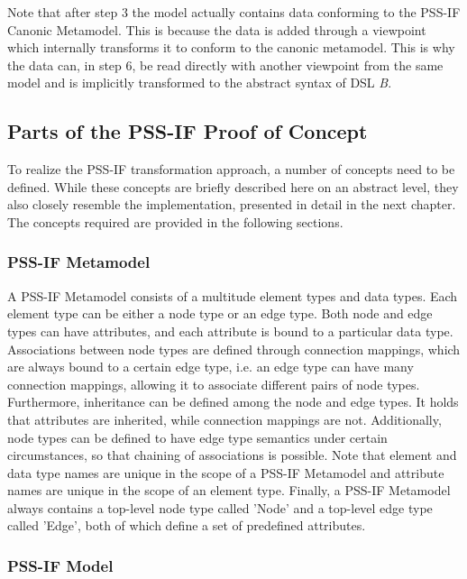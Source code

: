 Note that after step 3 the model actually contains data conforming to the PSS-IF Canonic Metamodel. This is because the data is added through a viewpoint which internally transforms it to conform to the canonic metamodel. This is why the data can, in step 6, be read directly with another viewpoint from the same model and is implicitly transformed to the abstract syntax of DSL \textit{B}.

\subsection{Parts of the PSS-IF Proof of Concept}

To realize the PSS-IF transformation approach, a number of concepts need to be defined. While these concepts are briefly described here on an abstract level, they also closely resemble the implementation, presented in detail in the next chapter. The concepts required are provided in the following sections.

\subsubsection{PSS-IF Metamodel}

A PSS-IF Metamodel consists of a multitude element types and data types. Each element type can be either a node type or an edge type. Both node and edge types can have attributes, and each attribute is bound to a particular data type. Associations between node types are defined through connection mappings, which are always bound to a certain edge type, i.e. an edge type can have many connection mappings, allowing it to associate different pairs of node types. Furthermore, inheritance can be defined among the node and edge types. It holds that attributes are inherited, while connection mappings are not. Additionally, node types can be defined to have edge type semantics under certain circumstances, so that chaining of associations is possible. Note that element and data type names are unique in the scope of a PSS-IF Metamodel and attribute names are unique in the scope of an element type. Finally, a PSS-IF Metamodel always contains a top-level node type called 'Node' and a top-level edge type called 'Edge', both of which define a set of predefined attributes.

\subsubsection{PSS-IF Model}

